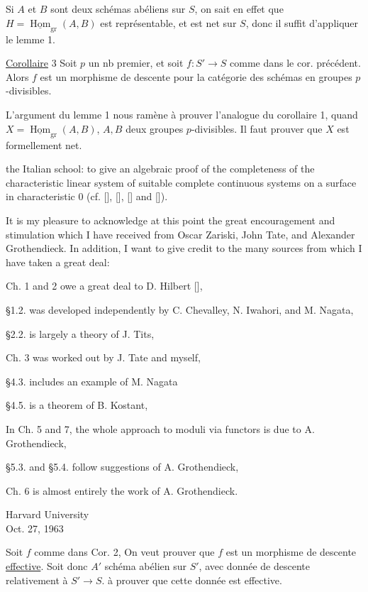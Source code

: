 Si $A$ et $B$ sont deux schémas abéliens sur $S$, on sait en effet que $H=\underline{\operatorname{Hom}}_{\mathrm{gr}}(A,B)$ est représentable, et est net sur $S$, donc il suffit d'appliquer le lemme 1.

\uline{Corollaire} 3 Soit $p$ un nb premier, et soit $f:S'\to S$ comme dans le cor. précédent. Alors $f$ est un morphisme de descente pour la catégorie des  schémas en groupes $p$-divisibles.

L'argument  du lemme 1 nous ramène à prouver l'analogue du corollaire 1, quand $X=\underline{\operatorname{Hom}}_{\mathrm{gr}}(A,B)$, $A,B$ deux groupes $p$-divisibles. Il faut prouver que $X$ est formellement net.


the Italian school: to give an algebraic proof of the completeness of the characteristic linear system of suitable complete continuous systems on a surface in characteristic 0 (cf. [], [], [] and []).

It is my pleasure to acknowledge at this point the great encouragement and stimulation which I have received from Oscar Zariski, John Tate, and Alexander Grothendieck. In addition, I want to give credit to the many sources from which I have taken a great deal:

Ch. 1 and 2 owe a great deal to D. Hilbert [],

\S1.2. was developed independently by C. Chevalley, N. Iwahori, and M. Nagata,

\S2.2. is largely a theory of J. Tits,

Ch. 3 was worked out by J. Tate and myself,

\S4.3. includes an example of M. Nagata

\S4.5. is a theorem of B. Kostant,

In Ch. 5 and 7, the whole approach to moduli via functors is due to A. Grothendieck,

\S5.3. and \S5.4. follow suggestions of A. Grothendieck,

Ch. 6 is almost entirely the work of A. Grothendieck.

\begin{flushright}
Harvard University\\
Oct. 27, 1963
\end{flushright}

Soit $f$ comme dans Cor. 2,  On veut prouver que $f$ est un morphisme de descente \uline{effective}. Soit donc $A'$ schéma abélien sur $S'$, avec donnée de descente relativement à $S'\to S$. à prouver que cette donnée est effective.

